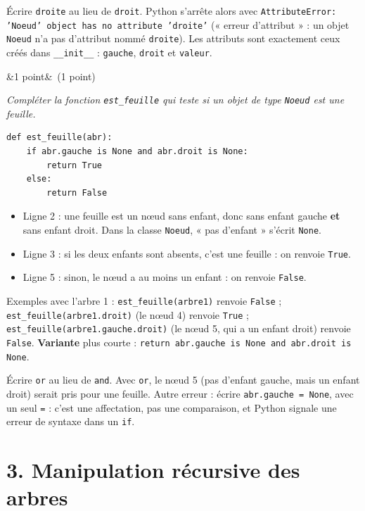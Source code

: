 \documentclass[11pt, a4paper]{exam}
\newcommand{\code}[1]{\texttt{#1}}
\newcommand{\Q}[3]{\par\needspace{5\baselineskip}\bigskip\noindent{\large\bfseries Question #1}\ifx&#2&\else\ \textnormal{(#2)}\fi\par\nopagebreak\smallskip\noindent\textit{#3}\par\nopagebreak\smallskip}
\begin{document}
\begin{erreur}
Écrire \code{droite} au lieu de \code{droit}. Python s'arrête alors avec \code{AttributeError: 'Noeud' object has no attribute 'droite'} (« erreur d'attribut » : un objet \code{Noeud} n'a pas d'attribut nommé \code{droite}). Les attributs sont exactement ceux créés dans \code{\_\_init\_\_} : \code{gauche}, \code{droit} et \code{valeur}.
\end{erreur}

\Q{4}{1 point}{Compléter la fonction \code{est\_feuille} qui teste si un objet de type \code{Noeud} est une feuille.}
\begin{reponse}
\begin{lstlisting}
def est_feuille(abr):
    if abr.gauche is None and abr.droit is None:
        return True
    else:
        return False
\end{lstlisting}
\end{reponse}
\begin{itemize}
\item Ligne 2 : une feuille est un nœud sans enfant, donc sans enfant gauche \textbf{et} sans enfant droit. Dans la classe \code{Noeud}, « pas d'enfant » s'écrit \code{None}.
\item Ligne 3 : si les deux enfants sont absents, c'est une feuille : on renvoie \code{True}.
\item Ligne 5 : sinon, le nœud a au moins un enfant : on renvoie \code{False}.
\end{itemize}
Exemples avec l'arbre 1 : \code{est\_feuille(arbre1)} renvoie \code{False} ; \code{est\_feuille(arbre1.droit)} (le nœud 4) renvoie \code{True} ; \code{est\_feuille(arbre1.gauche.droit)} (le nœud 5, qui a un enfant droit) renvoie \code{False}.
\textbf{Variante} plus courte : \code{return abr.gauche is None and abr.droit is None}.
\begin{erreur}
Écrire \code{or} au lieu de \code{and}. Avec \code{or}, le nœud 5 (pas d'enfant gauche, mais un enfant droit) serait pris pour une feuille. Autre erreur : écrire \code{abr.gauche = None}, avec un seul \code{=} : c'est une affectation, pas une comparaison, et Python signale une erreur de syntaxe dans un \code{if}.
\end{erreur}

\section*{3. Manipulation récursive des arbres}
\end{document}
